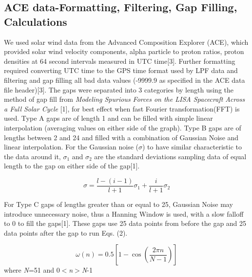 \documentclass[%
 reprint,
 amsmath,amssymb,
 aps,
]{revtex4-2}
\begin{document}
\subsection{ACE data-Formatting, Filtering, Gap Filling, Calculations
}
We used solar wind data from the Advanced Composition Explorer (ACE), which provided solar wind velocity components, alpha particle to proton ratios, proton densities at 64 second intervals measured in UTC time[3]. Further formatting required converting UTC time to the GPS time format used by LPF data and filtering and gap filling all bad data values (-9999.9 as specified in the ACE data file header)[3]. The gaps were separated into 3 categories by length using the method of gap fill from \textit{Modeling Spurious Forces on the LISA Spacecraft Across a Full Solar Cycle} [1], for best effect when fast Fourier transformation(FFT) is used. Type A gaps are of length 1 and can be filled with simple linear interpolation  (averaging values on either side of the graph). Type B gaps are of lengths between 2 and 24 and filled with a combination of Gaussian Noise and linear interpolation. For the Gaussian noise (\(\sigma\)) to have similar characteristic to the data around it, \(\sigma_{1}\) and \(\sigma_{2}\) are the standard deviations sampling data of equal length to the gap on either side of the gap[1].

\begin{equation}\label{eq:Gaussian Window Equations}
\sigma=\frac{l-(i-1)}{l+1}\sigma_{1}+\frac{i}{l+1}\sigma_{2}
\end{equation}

For Type C gaps of lengths greater than or equal to 25, Gaussian Noise may introduce unnecessary noise, thus a Hanning Window is used, with a slow falloff to 0 to fill the gaps[1]. These gaps use 25 data points from before the gap and 25 data points after the gap to run Eqs. (2).

\begin{equation}\label{eq:Hanning Window}
\omega(n)=0.5[1-\cos{(\frac{2\pi n}{N-1})}]
\end{equation}
where \textit{N}=51 and 0$<$\textit{n}$>$\textit{N}-1
\end{document}
